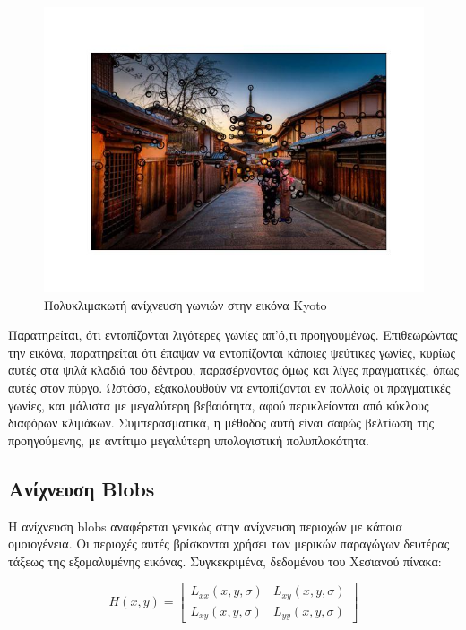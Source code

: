 \documentclass{article}
\newcommand{\eng}[1]{\foreignlanguage{english}{#1}}
\begin{document}
\begin{figure}[h]
    \centering
    \includegraphics[width=\textwidth]{../image-plots/corner-detection-multiscale.jpg}
    \caption{Πολυκλιμακωτή ανίχνευση γωνιών στην εικόνα \eng{Kyoto}}
    \label{fig:kyoto-corners-multiscale}
\end{figure}
\FloatBarrier

Παρατηρείται, ότι εντοπίζονται λιγότερες γωνίες απ'ό,τι προηγουμένως. Επιθεωρώντας την εικόνα, παρατηρείται ότι έπαψαν να εντοπίζονται κάποιες ψεύτικες γωνίες, κυρίως αυτές στα ψιλά κλαδιά του δέντρου, παρασέρνοντας όμως και λίγες πραγματικές, όπως αυτές στον πύργο. Ωστόσο, εξακολουθούν να εντοπίζονται εν πολλοίς οι πραγματικές γωνίες, και μάλιστα με μεγαλύτερη βεβαιότητα, αφού περικλείονται από κύκλους διαφόρων κλιμάκων. Συμπερασματικά, η μέθοδος αυτή είναι σαφώς βελτίωση της προηγούμενης, με αντίτιμο μεγαλύτερη υπολογιστική πολυπλοκότητα.

\subsection{Ανίχνευση \eng{Blobs}}

Η ανίχνευση \eng{blobs} αναφέρεται γενικώς στην ανίχνευση περιοχών με κάποια ομοιογένεια. Οι περιοχές αυτές βρίσκονται χρήσει των μερικών παραγώγων δευτέρας τάξεως της εξομαλυμένης εικόνας. Συγκεκριμένα,  δεδομένου του Χεσιανού πίνακα:

\begin{equation}
    H(x, y) = \begin{bmatrix} L_{xx}(x, y, \sigma) & L_{xy}(x, y, \sigma) \\
                L_{xy}(x, y, \sigma) & L_{yy}(x, y, \sigma)\end{bmatrix}
\end{equation}
\end{document}
